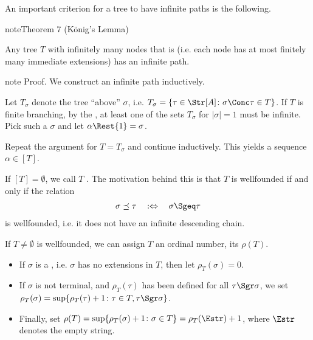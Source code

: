 \documentclass[letterpaper,10pt,english]{jupyterBook}
\begin{document}
\sphinxAtStartPar
An important criterion for a tree to have infinite paths is the following.
\label{trees:thm-Koenigs-lemma}
\begin{sphinxadmonition}{note}{Theorem 7 (König’s Lemma)}



\sphinxAtStartPar
Any tree \(T\) with infinitely many nodes that is  (i.e. each node has at most finitely many immediate extensions) has an infinite path.
\end{sphinxadmonition}

\begin{sphinxadmonition}{note}
\sphinxAtStartPar
Proof. We construct an infinite path inductively.

\sphinxAtStartPar
Let \(T_\sigma\) denote the tree “above” \(\sigma\), i.e. \(T_\sigma = \{ \tau \in \Str[A] \colon \sigma\Conc\tau \in T\}\). If \(T\) is finite branching,  by the , at least one of the sets \(T_\sigma\) for \(|\sigma| = 1\) must be infinite. Pick such a \(\sigma\) and let \(\alpha\Rest{1} = \sigma\).

\sphinxAtStartPar
Repeat the argument for \(T = T_\sigma\) and continue inductively. This yields a sequence \(\alpha \in [T]\).
\end{sphinxadmonition}

\sphinxAtStartPar
If \([T] = \emptyset\), we call \(T\) . The motivation behind this is that \(T\) is well\sphinxhyphen{}founded if and only if the  relation
\begin{equation*}
\begin{split}
	\sigma \preceq \tau \quad :\Leftrightarrow \quad \sigma \Sgeq \tau
\end{split}
\end{equation*}
\sphinxAtStartPar
is well\sphinxhyphen{}founded, i.e. it does not have an infinite descending chain.

\sphinxAtStartPar
If \(T \neq \emptyset\) is well\sphinxhyphen{}founded, we can assign \(T\) an ordinal number, its  \(\rho(T)\).
\begin{itemize}
\item {} 
\sphinxAtStartPar
If \(\sigma\) is a , i.e. \(\sigma\) has no extensions in \(T\), then let \(\rho_T(\sigma) = 0\).

\item {} 
\sphinxAtStartPar
If \(\sigma\) is not terminal, and \(\rho_T(\tau)\) has been defined for all \(\tau \Sgr \sigma\), we set \(\rho_T(\sigma) = \sup \{\rho_T(\tau)+1 \colon \tau \in T, \tau \Sgr \sigma \}\).

\item {} 
\sphinxAtStartPar
Finally, set \(\rho(T) = \sup\{\rho_T(\sigma) + 1 \colon \sigma\in T \} = \rho_T(\Estr)+1\), where \(\Estr\) denotes the empty string.

\end{itemize}
\end{document}
